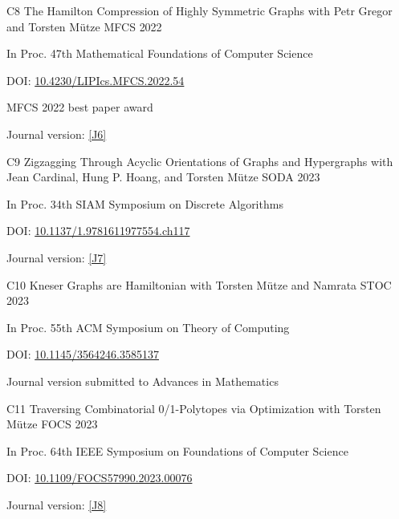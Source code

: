 \begin{cvpublication}
	{C8}
	{The Hamilton Compression of Highly Symmetric Graphs}
	{with Petr Gregor and Torsten Mütze}
	{MFCS}
	{2022}
    {
	\begin{cvitems}
	\item In Proc. 47th Mathematical Foundations of Computer Science
	\item[] DOI: \href{https://doi.org/10.4230/LIPIcs.MFCS.2022.54}{10.4230/LIPIcs.MFCS.2022.54}
	\item[] MFCS 2022 best paper award
	\item Journal version: \hyperlink{paperC6}{[J6]}
	\end{cvitems}
	}
\end{cvpublication}
\begin{cvpublication}
	{C9}
	{Zigzagging Through Acyclic Orientations of Graphs and Hypergraphs}
	{with Jean Cardinal, Hung P. Hoang, and Torsten Mütze}
	{SODA}
	{2023}
    {
	\begin{cvitems}
	\item In Proc. 34th SIAM Symposium on Discrete Algorithms
	\item[] DOI: \href{https://doi.org/10.1137/1.9781611977554.ch117}{10.1137/1.9781611977554.ch117}
	\item Journal version: \hyperlink{paperC7}{[J7]}
	\end{cvitems}
	}
\end{cvpublication}
\begin{cvpublication}
	{C10}
	{Kneser Graphs are Hamiltonian}
	{with Torsten Mütze and Namrata}
	{STOC}
	{2023}
    {
	\begin{cvitems}
	\item In Proc. 55th ACM Symposium on Theory of Computing
	\item[] DOI: \href{https://doi.org/10.1145/3564246.3585137}{10.1145/3564246.3585137}
	\item Journal version submitted to Advances in Mathematics
	\end{cvitems}
	}
\end{cvpublication}
\begin{cvpublication}
	{C11}
	{Traversing Combinatorial 0/1-Polytopes via Optimization}
	{with Torsten Mütze}
	{FOCS}
	{2023}
    {
	\begin{cvitems}
	\item In Proc. 64th IEEE Symposium on Foundations of Computer Science
	\item[] DOI: \href{https://doi.org/10.1109/FOCS57990.2023.00076}{10.1109/FOCS57990.2023.00076}
	\item Journal version: \hyperlink{paperC8}{[J8]}
	\end{cvitems}
	}
\end{cvpublication}
